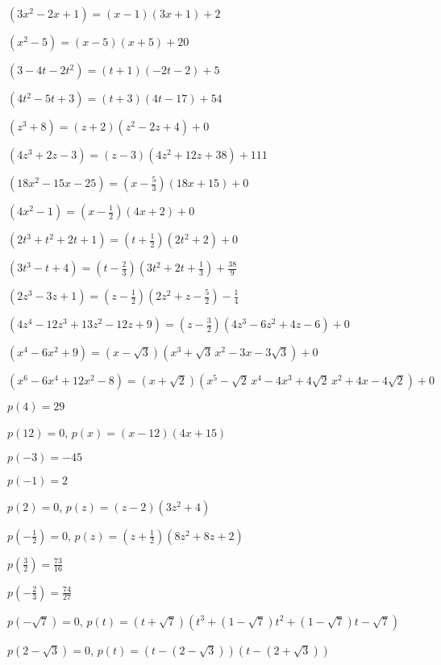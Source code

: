 \begin{exenum}

\item $\left(3x^2-2x+1 \right) = \left(x-1\right) (3x+1)+2$
\item $\left(x^2-5 \right)= \left(x-5\right)(x+5) + 20$


\item $\left(3-4t-2t^2 \right) = \left(t+1\right)(-2t-2)+5$
\item $\left(4t^2-5t +3\right) = \left(t+3\right)(4t-17)+54$


\item $\left(z^3 + 8 \right) = \left(z+2\right) \left(z^2-2z+4\right) + 0$
\item $\left(4z^3 +2z-3 \right) = \left(z -3\right) \left(4z^2+12z+38\right) + 111$


\item $\left(18x^2-15x-25\right) = \left(x - \frac{5}{3} \right)(18x+15)+0$
\item $\left(4x^2-1 \right) = \left(x - \frac{1}{2} \right)(4x+2)+0$


\item $\left(2t^3+t^2+2t+1 \right) = \left(t + \frac{1}{2} \right)\left(2t^2+2\right)+0$
\item $\left(3t^3 - t + 4 \right) = \left(t - \frac{2}{3} \right) \left(3t^2+2t+\frac{1}{3}\right) + \frac{38}{9}$


\item $\left(2z^3 - 3z +1 \right) = \left(z - \frac{1}{2} \right) \left(2z^2+z-\frac{5}{2}\right)-\frac{1}{4}$
\item $\left(4z^4-12z^3+13z^2 -12z+9\right) = \left(z - \frac{3}{2} \right) \left(4z^3-6z^2+4z-6 \right)+0$

\item $\left(x^4-6x^2+9 \right) = \left(x -\sqrt{3} \right) \left(x^3+\sqrt{3} \,x^2-3x-3\sqrt{3}\right) + 0$
\item $\left(x^6-6x^4+12x^2-8\right) = \left(x +\sqrt{2} \right) \left(x^5-\sqrt{2} \, x^4-4x^3+4\sqrt{2} \, x^2+4x-4\sqrt{2}\right) + 0$

\end{exenum}

\begin{shortexenum}
\item $p(4) = 29$
\item $p(12) =0$, $p(x) = (x-12)(4x+15)$
\item $p(-3)=-45$
\item $p(-1)=2$
\item $p(2) =0$, $p(z)= (z-2) \left(3z^2+4\right)$
\item $p\left(-\frac{1}{2}\right) = 0$, $p(z)  = \left(z+\frac{1}{2}\right)\left(8z^2+8z+2\right)$
\item $p\left(\frac{3}{2}\right) = \frac{73}{16}$
\item $p\left(-\frac{2}{3}\right) = \frac{74}{27}$
\item $p(-\sqrt{7}) = 0$, $p(t) = (t+\sqrt{7})\left(t^3+(1-\sqrt{7}) t^2+(1-\sqrt{7})t-\sqrt{7}  \right)$
\item $p(2-\sqrt{3}) =0$, $p(t) = (t-(2-\sqrt{3}))(t-(2+\sqrt{3})) $
\end{shortexenum}

